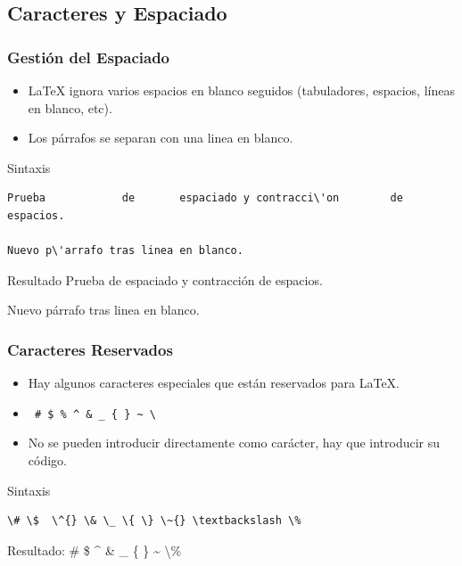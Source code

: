 \documentclass[aspectratio=169]{beamer}%
\begin{document}
\subsection{Caracteres y Espaciado}
\begin{frame}[fragile]
\frametitle{\textbf{Gestión del Espaciado}}
\justifying

\begin{itemize}\justifying
  \item \LaTeX{} ignora varios espacios en blanco seguidos (tabuladores, espacios, líneas en blanco, etc).
  \item Los párrafos se separan con una linea en blanco.
\end{itemize}
 \begin{block}{Sintaxis}
   
      \vspace{-0.3cm}
\begin{lstlisting}
Prueba            de       espaciado y contracci\'on        de     espacios.

Nuevo p\'arrafo tras linea en blanco.
\end{lstlisting}\vspace{-0.3cm}
\end{block}

\begin{exampleblock}{Resultado}
Prueba            de       espaciado y contracci\'on        de     espacios.

Nuevo p\'arrafo tras linea en blanco.
\end{exampleblock}

\end{frame}

\begin{frame}[fragile]
\frametitle{\textbf{Caracteres Reservados}}
\justifying
 \begin{itemize}\justifying
  \item Hay algunos caracteres especiales que están reservados para \LaTeX{}.
  \item \verb+ # $ % ^ & _ { } ~ \+
  \item No se pueden introducir directamente como carácter, hay que introducir su código.
\end{itemize}

\begin{block}{Sintaxis}
   \vspace{-0.3cm}
\begin{lstlisting}
\# \$  \^{} \& \_ \{ \} \~{} \textbackslash \%
\end{lstlisting}\vspace{-0.3cm}

\end{block}

\begin{exampleblock}{Resultado:}
\# \$  \^{} \& \_ \{ \} \~{} \textbackslash \%
\end{exampleblock}



\end{frame}
\end{document}
